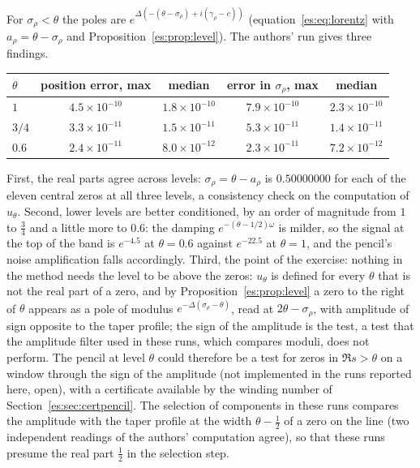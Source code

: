 For $\sigma_\rho<\theta$ the poles are $e^{\Delta(-(\theta-\sigma_\rho)+i(\gamma_\rho-c))}$ (equation~\eqref{es:eq:lorentz} with $a_\rho=\theta-\sigma_\rho$ and Proposition~\ref{es:prop:level}). The authors' run gives three findings.

\begin{center}
\small
\begin{tabular}{lcccc}
\toprule
$\theta$ & position error, max & median & error in $\sigma_\rho$, max & median\\
\midrule
$1$ & $4.5\times10^{-10}$ & $1.8\times10^{-10}$ & $7.9\times10^{-10}$ & $2.3\times10^{-10}$\\
$3/4$ & $3.3\times10^{-11}$ & $1.5\times10^{-11}$ & $5.3\times10^{-11}$ & $1.4\times10^{-11}$\\
$0.6$ & $2.4\times10^{-11}$ & $8.0\times10^{-12}$ & $2.3\times10^{-11}$ & $7.2\times10^{-12}$\\
\bottomrule
\end{tabular}
\end{center}

\noindent First, the real parts agree across levels: $\sigma_\rho=\theta-a_\rho$ is $0.50000000$ for each of the eleven central zeros at all three levels, a consistency check on the computation of $u_\theta$. Second, lower levels are better conditioned, by an order of magnitude from $1$ to $\tfrac34$ and a little more to $0.6$: the damping $e^{-(\theta-1/2)\omega}$ is milder, so the signal at the top of the band is $e^{-4.5}$ at $\theta=0.6$ against $e^{-22.5}$ at $\theta=1$, and the pencil's noise amplification falls accordingly. Third, the point of the exercise: nothing in the method needs the level to be above the zeros: $u_\theta$ is defined for every $\theta$ that is not the real part of a zero, and by Proposition~\ref{es:prop:level} a zero to the right of $\theta$ appears as a pole of modulus $e^{-\Delta(\sigma_\rho-\theta)}$, read at $2\theta-\sigma_\rho$, with amplitude of sign opposite to the taper profile; the sign of the amplitude is the test, a test that the amplitude filter used in these runs, which compares moduli, does not perform. The pencil at level $\theta$ could therefore be a test for zeros in $\Re s>\theta$ on a window through the sign of the amplitude (not implemented in the runs reported here, open), with a certificate available by the winding number of Section~\ref{es:sec:certpencil}. The selection of components in these runs compares the amplitude with the taper profile at the width $\theta-\tfrac12$ of a zero on the line (two independent readings of the authors' computation agree), so that these runs presume the real part $\tfrac12$ in the selection step.

